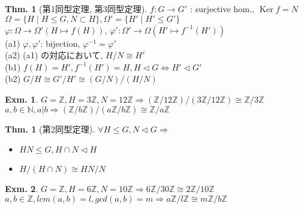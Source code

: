 \documentclass[uplatex,dvipdfmx,9pt]{beamer}
\newcommand{\nsubgroup}{\vartriangleleft} %
\newcommand{\inverse}[1]{#1^{-1}}
\newcommand{\Ker}{\operatorname{Ker}}
\newcounter{textThmCount}
\theoremstyle{definition} %
\newtheorem{thmText}[textThmCount]{Thm.}
\theoremstyle{example}
\newtheorem{exm}{Exm.}[subsection]
\begin{document}
      \begin{frame}

        \begin{thmText}[第1同型定理, 第3同型定理]
          $f\colon G \to G'$ : surjective hom., $\Ker f = N$ \\
          $\Omega = \{ H \mid H \le G, N \subset H \}, \Omega' = \{ H' \mid H' \le G' \}$ \\
          $\varphi\colon \Omega \to \Omega'(H \mapsto f(H))$, $\varphi'\colon \Omega' \to \Omega (H' \mapsto \inverse{f}(H'))$ \\
          (a1) $\varphi, \varphi'$: bijection, $\inverse{\varphi} = \varphi'$ \\
          (a2) (a1) の対応において, $H/N \cong H'$ \\
          (b1) $f(H) = H', \inverse{f}(H') = H, H \nsubgroup G \Leftrightarrow H' \nsubgroup G'$ \\
          (b2) $G/H \cong G'/H' \cong (G/N)/(H/N)$
        \end{thmText} 

        \begin{exm}
          $G = \mathbb{Z}, H = 3\mathbb{Z}, N = 12\mathbb{Z} \Rightarrow (\mathbb{Z} / 12\mathbb{Z}) / (3\mathbb{Z} / 12\mathbb{Z}) \cong \mathbb{Z} / 3\mathbb{Z}$ \\
          $a, b \in \mathbb{N}, a|b \Rightarrow (\mathbb{Z} / b\mathbb{Z}) / (a\mathbb{Z} / b\mathbb{Z}) \cong \mathbb{Z} / a\mathbb{Z}$
        \end{exm}
        
      \end{frame}

      \begin{frame}

        \begin{thmText}[第2同型定理]
          $\forall H \le G, N \nsubgroup G \Rightarrow $
          \begin{itemize}
            \item $HN \le G, H \cap N \nsubgroup H$
            \item $H/(H \cap N) \cong HN/N$
          \end{itemize}
        \end{thmText}

        \begin{exm}
          $G = \mathbb{Z}, H = 6\mathbb{Z}, N = 10\mathbb{Z} \Rightarrow 6\mathbb{Z} / 30\mathbb{Z} \cong 2\mathbb{Z} / 10\mathbb{Z}$ \\
          $a, b \in \mathbb{Z}, lcm(a, b) = l, gcd(a, b) = m \Rightarrow a\mathbb{Z} / l\mathbb{Z} \cong m\mathbb{Z} / b\mathbb{Z}$
        \end{exm}

      \end{frame}
\end{document}
